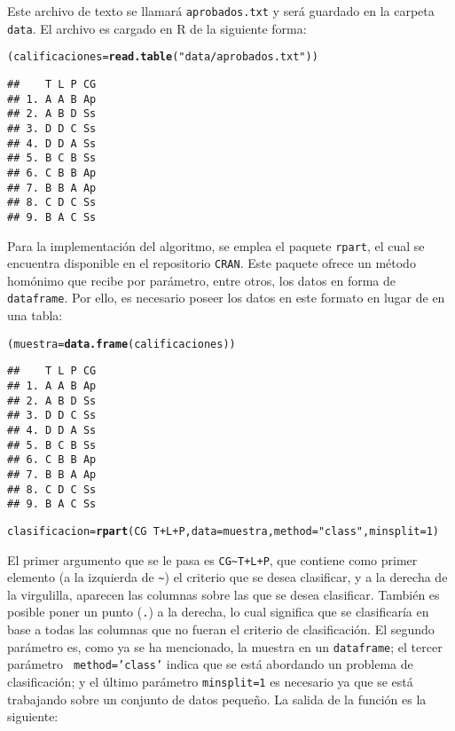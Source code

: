 \documentclass[12pt]{report}\usepackage[]{graphicx}\usepackage[dvipsnames]{xcolor}
\makeatletter
\newcommand{\hlnum}[1]{\textcolor[rgb]{0.686,0.059,0.569}{#1}}%
\newcommand{\hlstr}[1]{\textcolor[rgb]{0.192,0.494,0.8}{#1}}%
\newcommand{\hlopt}[1]{\textcolor[rgb]{0,0,0}{#1}}%
\newcommand{\hlstd}[1]{\textcolor[rgb]{0.345,0.345,0.345}{#1}}%
\newcommand{\hlkwb}[1]{\textcolor[rgb]{0.69,0.353,0.396}{#1}}%
\newcommand{\hlkwc}[1]{\textcolor[rgb]{0.333,0.667,0.333}{#1}}%
\newcommand{\hlkwd}[1]{\textcolor[rgb]{0.737,0.353,0.396}{\textbf{#1}}}%
\newenvironment{kframe}{%
 \def\at@end@of@kframe{}%
 \ifinner\ifhmode%
  \def\at@end@of@kframe{\end{minipage}}%
  \begin{minipage}{\columnwidth}%
 \fi\fi%
 \def\FrameCommand##1{\hskip\@totalleftmargin \hskip-\fboxsep
 \colorbox{shadecolor}{##1}\hskip-\fboxsep
     \hskip-\linewidth \hskip-\@totalleftmargin \hskip\columnwidth}%
 \MakeFramed {\advance\hsize-\width
   \@totalleftmargin\z@ \linewidth\hsize
   \@setminipage}}%
 {\par\unskip\endMakeFramed%
 \at@end@of@kframe}
\newenvironment{knitrout}{}{} %
\makeatother
\begin{document}
				Este archivo de texto se llamará \texttt{aprobados.txt} y será guardado en la carpeta \texttt{data}. El archivo es cargado en R de la siguiente forma:
				
\begin{knitrout}
\color{fgcolor}\begin{kframe}
\begin{alltt}
\hlstd{(calificaciones}\hlkwb{=}\hlkwd{read.table}\hlstd{(}\hlstr{"data/aprobados.txt"}\hlstd{))}
\end{alltt}
\begin{verbatim}
##    T L P CG
## 1. A A B Ap
## 2. A B D Ss
## 3. D D C Ss
## 4. D D A Ss
## 5. B C B Ss
## 6. C B B Ap
## 7. B B A Ap
## 8. C D C Ss
## 9. B A C Ss
\end{verbatim}
\end{kframe}
\end{knitrout}
				
				Para la implementación del algoritmo, se emplea el paquete \texttt{rpart}, el cual se encuentra disponible en el repositorio \texttt{CRAN}. Este paquete ofrece un método homónimo que recibe por parámetro, entre otros, los datos en forma de \texttt{dataframe}. Por ello, es necesario poseer los datos en este formato en lugar de en una tabla:
				
\begin{knitrout}
\color{fgcolor}\begin{kframe}
\begin{alltt}
\hlstd{(muestra}\hlkwb{=}\hlkwd{data.frame}\hlstd{(calificaciones))}
\end{alltt}
\begin{verbatim}
##    T L P CG
## 1. A A B Ap
## 2. A B D Ss
## 3. D D C Ss
## 4. D D A Ss
## 5. B C B Ss
## 6. C B B Ap
## 7. B B A Ap
## 8. C D C Ss
## 9. B A C Ss
\end{verbatim}
\begin{alltt}
\hlstd{clasificacion} \hlkwb{=} \hlkwd{rpart}\hlstd{(CG}\hlopt{~}\hlstd{T}\hlopt{+}\hlstd{L}\hlopt{+}\hlstd{P,} \hlkwc{data}\hlstd{=muestra,} \hlkwc{method}\hlstd{=}\hlstr{"class"}\hlstd{,} \hlkwc{minsplit}\hlstd{=}\hlnum{1}\hlstd{)}
\end{alltt}
\end{kframe}
\end{knitrout}
				
				El primer argumento que se le pasa es \texttt{CG\~{}T+L+P}, que contiene como primer elemento (a la izquierda de \texttt{\~}) el criterio que se desea clasificar, y a la derecha de la virgulilla, aparecen las columnas sobre las que se desea clasificar. También es posible poner un punto (\texttt{.}) a la derecha, lo cual significa que se clasificaría en base a todas las columnas que no fueran el criterio de clasificación. El segundo parámetro es, como ya se ha mencionado, la muestra en un \texttt{dataframe}; el tercer parámetro \texttt{ method='class'} indica que se está abordando un problema de clasificación; y el último parámetro \texttt{minsplit=1} es necesario ya que se está trabajando sobre un conjunto de datos pequeño. La salida de la función es la siguiente:
				
\end{document}
